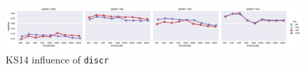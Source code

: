 \begin{figure}
  \centering

  \includegraphics[width=1.1\textwidth]{supplement/figures/KS14-interaction-discr}

  \caption{KS14 influence of \texttt{discr}}
  \label{fig:ks14-discr}
\end{figure}
